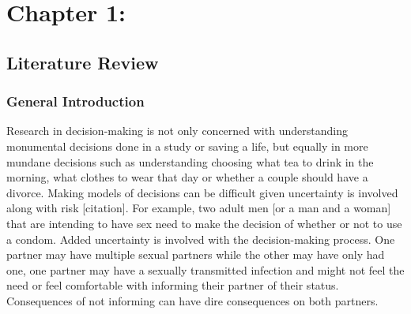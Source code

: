\documentclass[
  donotrepeattitle,doc, 12pt, a4paper,floatsintext]{apa7}
\begin{document}
\mbox{}\thispagestyle{empty}\clearpage

\newpage

\tableofcontents

\newpage

\hypertarget{chapter-1}{%
\section{Chapter 1:}\label{chapter-1}}

\hypertarget{literature-review}{%
\subsection{Literature Review}\label{literature-review}}

\hypertarget{general-introduction}{%
\subsubsection{General Introduction}\label{general-introduction}}

Research in decision-making is not only concerned with understanding monumental decisions done in a study or saving a life, but equally in more mundane decisions such as understanding choosing what tea to drink in the morning, what clothes to wear that day or whether a couple should have a divorce. Making models of decisions can be difficult given uncertainty is involved along with risk {[}citation{]}. For example, two adult men {[}or a man and a woman{]} that are intending to have sex need to make the decision of whether or not to use a condom. Added uncertainty is involved with the decision-making process. One partner may have multiple sexual partners while the other may have only had one, one partner may have a sexually transmitted infection and might not feel the need or feel comfortable with informing their partner of their status. Consequences of not informing can have dire consequences on both partners.
\end{document}
